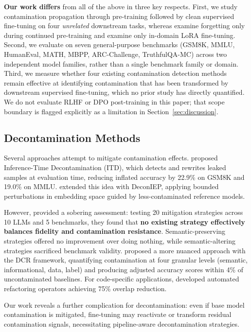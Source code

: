 \textbf{Our work differs} from all of the above in three key respects. First, we study contamination propagation through pre-training followed by clean supervised fine-tuning on four \emph{unrelated} downstream tasks, whereas \citet{bordt2025forgetting} examine forgetting only during continued pre-training and \citet{zhang2026leakagetrap} examine only in-domain LoRA fine-tuning. Second, we evaluate on seven general-purpose benchmarks (GSM8K, MMLU, HumanEval, MATH, MBPP, ARC-Challenge, TruthfulQA-MC) across two independent model families, rather than a single benchmark family or domain. Third, we measure whether four existing contamination detection methods remain effective at identifying contamination that has been transformed by downstream supervised fine-tuning, which no prior study has directly quantified. We do not evaluate RLHF or DPO post-training in this paper; that scope boundary is flagged explicitly as a limitation in Section~\ref{sec:discussion}.

\subsection{Decontamination Methods}

Several approaches attempt to mitigate contamination effects. \citet{zhu2024itd} proposed Inference-Time Decontamination (ITD), which detects and rewrites leaked samples at evaluation time, reducing inflated accuracy by 22.9\% on GSM8K and 19.0\% on MMLU. \citet{chai2026deconIEP} extended this idea with DeconIEP, applying bounded perturbations in embedding space guided by less-contaminated reference models.

However, \citet{sun2025emperor} provided a sobering assessment: testing 20 mitigation strategies across 10 LLMs and 5 benchmarks, they found that \textbf{no existing strategy effectively balances fidelity and contamination resistance}. Semantic-preserving strategies offered no improvement over doing nothing, while semantic-altering strategies sacrificed benchmark validity. \citet{xu2025dcr} proposed a more nuanced approach with the DCR framework, quantifying contamination at four granular levels (semantic, informational, data, label) and producing adjusted accuracy scores within 4\% of uncontaminated baselines. For code-specific applications, \citet{codecleaner2025} developed automated refactoring operators achieving 75\% overlap reduction.

Our work reveals a further complication for decontamination: even if base model contamination is mitigated, fine-tuning may reactivate or transform residual contamination signals, necessitating pipeline-aware decontamination strategies.

